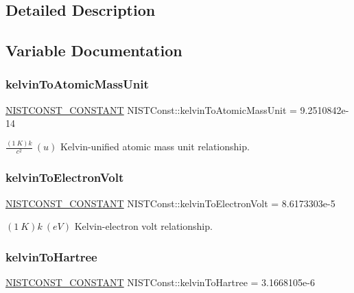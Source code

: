 \subsection{Detailed Description}


\subsection{Variable Documentation}
\mbox{\label{group___n_i_s_t_const-_kelvin_ga06d7f847cbeeb75fd01a52b95b60de50}} 
\subsubsection{\texorpdfstring{kelvin\+To\+Atomic\+Mass\+Unit}{kelvinToAtomicMassUnit}}
{\footnotesize\ttfamily \mbox{\hyperlink{_n_i_s_t_const_8hpp_a2b0fc1d7452373f816175dd86ce26729}{N\+I\+S\+T\+C\+O\+N\+S\+T\+\_\+\+C\+O\+N\+S\+T\+A\+NT}} N\+I\+S\+T\+Const\+::kelvin\+To\+Atomic\+Mass\+Unit = 9.\+2510842e-\/14}

$\frac{(1\ K)k}{c^2} \ (u)$ Kelvin-\/unified atomic mass unit relationship. \mbox{\label{group___n_i_s_t_const-_kelvin_ga85355343e763185fe602b8eeacebc12d}} 
\subsubsection{\texorpdfstring{kelvin\+To\+Electron\+Volt}{kelvinToElectronVolt}}
{\footnotesize\ttfamily \mbox{\hyperlink{_n_i_s_t_const_8hpp_a2b0fc1d7452373f816175dd86ce26729}{N\+I\+S\+T\+C\+O\+N\+S\+T\+\_\+\+C\+O\+N\+S\+T\+A\+NT}} N\+I\+S\+T\+Const\+::kelvin\+To\+Electron\+Volt = 8.\+6173303e-\/5}

$(1\ K)k \ (eV)$ Kelvin-\/electron volt relationship. \mbox{\label{group___n_i_s_t_const-_kelvin_gaddf6d309db30c552489d13894901746a}} 
\subsubsection{\texorpdfstring{kelvin\+To\+Hartree}{kelvinToHartree}}
{\footnotesize\ttfamily \mbox{\hyperlink{_n_i_s_t_const_8hpp_a2b0fc1d7452373f816175dd86ce26729}{N\+I\+S\+T\+C\+O\+N\+S\+T\+\_\+\+C\+O\+N\+S\+T\+A\+NT}} N\+I\+S\+T\+Const\+::kelvin\+To\+Hartree = 3.\+1668105e-\/6}

